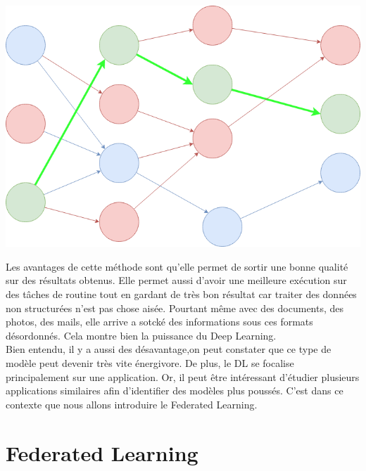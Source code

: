 \documentclass[12pt,a4paper]{report}
\begin{document}
\begin{center}
	\includegraphics[scale=0.4]{deep_learning_schema}
	\label{fig1}
\end{center}

Les avantages de cette méthode sont qu'elle permet de sortir une bonne qualité sur des résultats obtenus. Elle permet aussi d'avoir une meilleure exécution sur des tâches de routine tout en gardant de très bon résultat car traiter des données non structurées n'est pas chose aisée. Pourtant même avec des documents, des photos, des mails, elle arrive a sotcké des informations sous ces formats désordonnés. Cela montre bien la puissance du Deep Learning.\\

Bien entendu, il y a aussi des désavantage,on peut constater que ce type de modèle peut devenir très vite énergivore. De plus, le DL se focalise principalement sur une application. Or, il peut être intéressant d'étudier plusieurs applications similaires afin d'identifier des modèles plus poussés. C'est dans ce contexte que nous allons introduire le Federated Learning.
\pagebreak


\chapter{Federated Learning}
\end{document}

